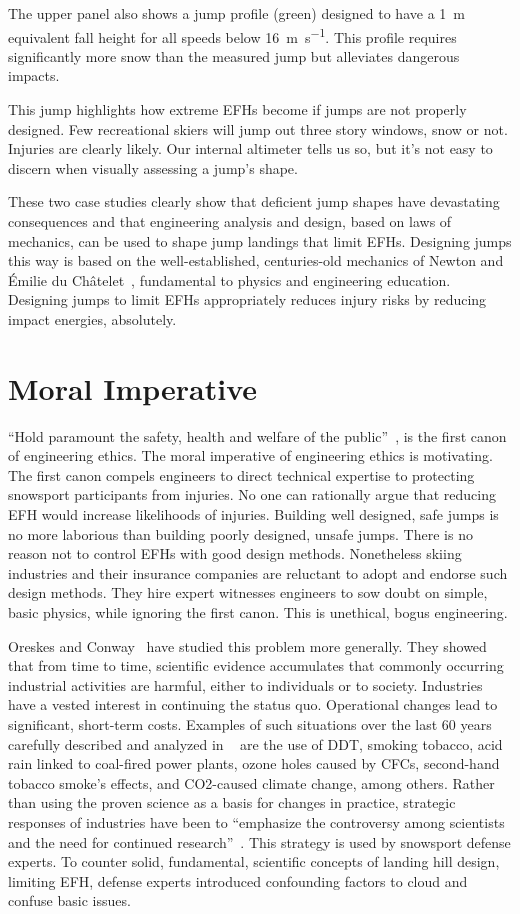 \documentclass[smallextended]{svjour3}       %
\begin{document}
The upper panel also shows a jump profile (green) designed to have a
1~\si{\meter} equivalent fall height for all speeds below
16~\si{\meter\per\second}. This profile requires significantly more snow than
the measured jump but alleviates dangerous impacts.

This jump highlights how extreme EFHs become if jumps are not properly
designed. Few recreational skiers will jump out three story windows, snow or
not. Injuries are clearly likely.  Our internal altimeter tells us so, but it's
not easy to discern when visually assessing a jump's shape.

These two case studies clearly show that deficient jump shapes have devastating
consequences and that engineering analysis and design, based on laws of
mechanics, can be used to shape jump landings that limit EFHs. Designing jumps
this way is based on the well-established, centuries-old mechanics of Newton
and Émilie du Châtelet~\cite{Zinsser2007}, fundamental to physics and
engineering education. Designing jumps to limit EFHs appropriately reduces
injury risks by reducing impact energies, absolutely.

\section{Moral Imperative}
\label{sec:moral}
%
``Hold paramount the safety, health and welfare of the
public''~\cite{NSPE2019}, is the first canon of engineering ethics. The moral
imperative of engineering ethics is motivating. The first canon compels
engineers to direct technical expertise to protecting snowsport participants
from injuries. No one can rationally argue that reducing EFH would increase
likelihoods of injuries. Building well designed, safe jumps is no more
laborious than building poorly designed, unsafe jumps. There is no reason not
to control EFHs with good design methods. Nonetheless skiing industries and
their insurance companies are reluctant to adopt and endorse such design
methods. They hire expert witnesses engineers to sow doubt on simple, basic
physics, while ignoring the first canon. This is unethical, bogus engineering.

Oreskes and Conway~\cite{Oreskes2010} have studied this problem more generally.
They showed that from time to time, scientific evidence accumulates that
commonly occurring industrial activities are harmful, either to individuals or
to society. Industries have a vested interest in continuing the status quo.
Operational changes  lead to significant, short-term costs. Examples of such
situations over the last 60 years carefully described and analyzed in
~\cite{Oreskes2010} are the use of DDT, smoking tobacco, acid rain linked to
coal-fired power plants, ozone holes caused by CFCs, second-hand tobacco
smoke’s effects, and CO2-caused climate change, among others. Rather than using
the proven science as a basis for changes in practice, strategic responses of
industries have been to “emphasize the controversy among scientists and the
need for continued research”~\cite{Oreskes2010}. This strategy is used by
snowsport defense experts. To counter solid, fundamental, scientific concepts
of landing hill design, limiting EFH, defense experts introduced confounding
factors to cloud and confuse basic issues.
\end{document}
